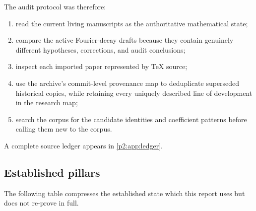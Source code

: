 \documentclass[11pt,oneside]{article}
\numberwithin{equation}{section}
\theoremstyle{definition}
\theoremstyle{remark}
\begin{document}
The audit protocol was therefore:
\begin{enumerate}
\item read the current living manuscripts as the authoritative mathematical state;
\item compare the active Fourier-decay drafts because they contain genuinely different
      hypotheses, corrections, and audit conclusions;
\item inspect each imported paper represented by TeX source;
\item use the archive's commit-level provenance map to deduplicate superseded historical
      copies, while retaining every uniquely described line of development in the research map;
\item search the corpus for the candidate identities and coefficient patterns before calling
      them new to the corpus.
\end{enumerate}
A complete source ledger appears in \cref{p2:app:ledger}.

\subsection{Established pillars}

The following table compresses the established state which this report uses but does not
re-prove in full.
\end{document}
